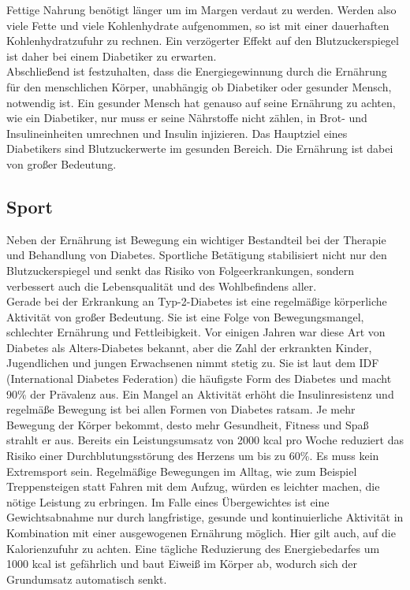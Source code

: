 		Fettige Nahrung benötigt länger um im Margen verdaut zu werden. Werden also viele Fette und viele Kohlenhydrate aufgenommen, so ist mit einer dauerhaften Kohlenhydratzufuhr zu rechnen. Ein verzögerter Effekt auf den Blutzuckerspiegel ist daher bei einem Diabetiker zu erwarten. \cite{SG}\\
		Abschließend ist festzuhalten, dass die Energiegewinnung durch die Ernährung für den menschlichen Körper, unabhängig ob Diabetiker oder gesunder Mensch, notwendig ist. Ein gesunder Mensch hat genauso auf seine Ernährung zu achten, wie ein Diabetiker, nur muss er seine Nährstoffe nicht zählen, in Brot- und Insulineinheiten umrechnen und Insulin injizieren. Das Hauptziel eines Diabetikers sind Blutzuckerwerte im gesunden Bereich. Die Ernährung ist dabei von großer Bedeutung.

\subsection{Sport}
	Neben der Ernährung ist Bewegung ein wichtiger Bestandteil bei der Therapie und Behandlung von Diabetes. Sportliche Betätigung stabilisiert nicht nur den Blutzuckerspiegel und senkt das Risiko von Folgeerkrankungen, sondern verbessert auch die Lebensqualität und des Wohlbefindens aller.\cite{SG}\\
	Gerade bei der Erkrankung an Typ-2-Diabetes ist eine regelmäßige körperliche Aktivität von großer Bedeutung. Sie ist eine Folge von Bewegungsmangel, schlechter Ernährung und Fettleibigkeit. Vor einigen Jahren war diese Art von Diabetes als \glqq Alters-Diabetes\grqq{} bekannt, aber die Zahl der erkrankten Kinder, Jugendlichen und jungen Erwachsenen nimmt stetig zu. Sie ist laut dem IDF (International Diabetes Federation) die häufigste Form des Diabetes und macht 90\% der Prävalenz aus.\cite{IDF}\newline
	Ein Mangel an Aktivität erhöht die Insulinresistenz und regelmäße Bewegung ist bei allen Formen von Diabetes ratsam. Je mehr Bewegung der Körper bekommt, desto mehr Gesundheit, Fitness und Spaß strahlt er aus. Bereits ein Leistungsumsatz von 2000 kcal pro Woche reduziert das Risiko einer Durchblutungsstörung des Herzens um bis zu 60\%. Es muss kein Extremsport sein. Regelmäßige Bewegungen im Alltag, wie zum Beispiel Treppensteigen statt Fahren mit dem Aufzug, würden es leichter machen, die nötige Leistung zu erbringen. \newline
	Im Falle eines Übergewichtes ist eine Gewichtsabnahme nur durch langfristige, gesunde und kontinuierliche Aktivität in Kombination mit einer ausgewogenen Ernährung möglich. Hier gilt auch, auf die Kalorienzufuhr zu achten. Eine tägliche Reduzierung des Energiebedarfes um 1000 kcal ist gefährlich und baut Eiweiß im Körper ab, wodurch sich der Grundumsatz automatisch senkt.\newline 
